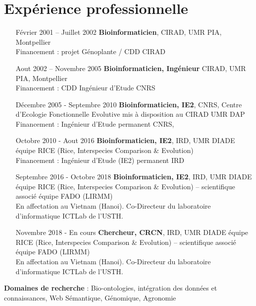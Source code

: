 \section{Expérience professionnelle}
\begin{itemize}
\item[Février 2001 – Juillet 2002 ]  \textbf{Bioinformaticien}, CIRAD, UMR PIA, Montpellier \\
Financement : projet Génoplante / CDD CIRAD	
\item[Aout 2002 – Novembre 2005]  \textbf{Bioinformaticien, Ingénieur} CIRAD, UMR PIA, Montpellier \\
Financement : CDD Ingénieur d’Etude CNRS 
\item[Décembre 2005 - Septembre 2010]  \textbf{Bioinformaticien, IE2}, CNRS, Centre d’Ecologie Fonctionnelle Evolutive mis à disposition au CIRAD UMR DAP \\
Financement : Ingénieur d’Etude permanent CNRS, 
\item[Octobre 2010 - Aout 2016]  \textbf{Bioinformaticien, IE2}, IRD, UMR DIADE équipe RICE (Rice, Interspecies Comparison \& Evolution)\\
Financement : Ingénieur d’Etude (IE2) permanent IRD
\item[Septembre 2016 - Octobre 2018]  \textbf{Bioinformaticien, IE2}, IRD, UMR DIADE équipe RICE (Rice, Interspecies Comparison \& Evolution) – scientifique associé équipe FADO (LIRMM)\\
En affectation au Vietnam (Hanoi). Co-Directeur du laboratoire d’informatique ICTLab de l’USTH.
\item[Novembre 2018 - En cours]  \textbf{Chercheur, CRCN}, IRD, UMR DIADE équipe RICE (Rice, Interspecies Comparison \& Evolution) – scientifique associé équipe FADO (LIRMM)\\
En affectation au Vietnam (Hanoi). Co-Directeur du laboratoire d’informatique ICTLab de l’USTH.

\end{itemize}

\vspace{1cm}
\textbf{Domaines de recherche} : 	Bio-ontologies, intégration des données et connaissances, Web Sémantique, Génomique, Agronomie
